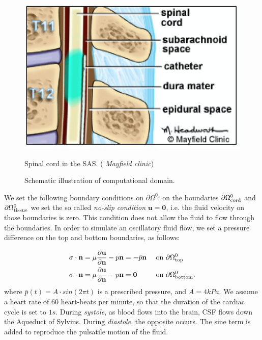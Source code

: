 \documentclass[a4paper,11pt,oneside]{book}
\begin{document}
\begin{figure}[h!]
\begin{minipage}[b]{.5\textwidth}
\centering
\includegraphics[width=.9\textwidth]{images/sas2}
\caption{Spinal cord in the SAS. (\textcopyright \emph{ Mayfield clinic})}
\label{img:cns:3}
\end{minipage}
\begin{minipage}[b]{.4\textwidth}
\centering
{}
\caption{Schematic illustration of computational domain.}
\label{img:cns:4}
\end{minipage}
\end{figure}
We set the following boundary conditions on $\partial \Omega^0$: on the boundaries $\partial \Omega_{\rm cord}^0$ and $\partial \Omega_{\rm tissue}^0$ we set the so called \emph{no-slip condition} $\mathbf{u = 0}$, i.e. the fluid velocity on those boundaries is zero. This condition does not allow the fluid to flow through the boundaries.
In order to simulate an oscillatory fluid flow, we set a pressure difference on the top and bottom boundaries, as follows:

\begin{align}
\label{eq:bc:6}
\sigma \cdot \mathbf{n} &= \mu \frac{\partial \mathbf{u}}{\partial \mathbf{n}} - p \mathbf{n} = -\bar{p} \mathbf{n} && \text { on } \partial \Omega_{\rm top}^0 \\
\label{eq:bc:6bis}
\sigma \cdot \mathbf{n} &= \mu \frac{\partial \mathbf{u}}{\partial \mathbf{n}} - p \mathbf{n} = \mathbf{0}  && \text { on } \partial \Omega_{\rm bottom}^0.
\end{align}
where $\bar{p}(t) = A \cdot sin(2\pi t)$ is a prescribed pressure, and $A = 4kPa$. We assume a heart rate of $60$ heart-beats per minute, so that the duration of the cardiac cycle is set to $1s$. During \textit{systole}, as blood flows into the brain, CSF flows down the Aqueduct of Sylvius. During \textit{diastole}, the opposite occurs. The sine term is added to reproduce the pulsatile motion of the fluid. 
\end{document}
